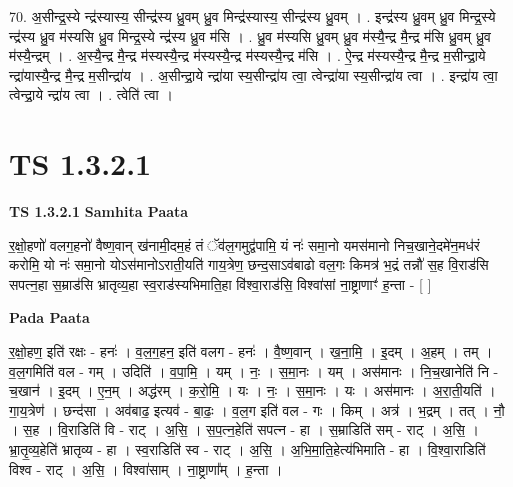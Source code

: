 \documentclass[17pt]{extarticle}
\begin{document}
70. अ॒सीन्द्र॒स्ये न्द्र॑स्यास्य॒ सीन्द्र॑स्य ध्रु॒वम् ध्रु॒व मिन्द्र॑स्यास्य॒ सीन्द्र॑स्य ध्रु॒वम् । . इन्द्र॑स्य ध्रु॒वम् ध्रु॒व मिन्द्र॒स्ये न्द्र॑स्य ध्रु॒व म॑स्यसि ध्रु॒व मिन्द्र॒स्ये न्द्र॑स्य ध्रु॒व म॑सि । . ध्रु॒व म॑स्यसि ध्रु॒वम् ध्रु॒व म॑स्यै॒न्द्र मै॒न्द्र म॑सि ध्रु॒वम् ध्रु॒व म॑स्यै॒न्द्रम् । . अ॒स्यै॒न्द्र मै॒न्द्र म॑स्यस्यै॒न्द्र म॑स्यस्यै॒न्द्र म॑स्यस्यै॒न्द्र म॑सि । . ऐ॒न्द्र म॑स्यस्यै॒न्द्र मै॒न्द्र म॒सीन्द्रा॒ये न्द्रा॑यास्यै॒न्द्र मै॒न्द्र म॒सीन्द्रा॑य । . अ॒सीन्द्रा॒ये न्द्रा॑या स्य॒सीन्द्रा॑य त्वा॒ त्वेन्द्रा॑या स्य॒सीन्द्रा॑य त्वा । . इन्द्रा॑य त्वा॒ त्वेन्द्रा॒ये न्द्रा॑य त्वा । . त्वेति॑ त्वा । \newline
\pagebreak
{}
\section*{ TS 1.3.2.1 }

\textbf{TS 1.3.2.1 } \newline
\textbf{Samhita Paata} \newline

र॒क्षो॒हणो॑ वलग॒हनो॑ वैष्ण॒वान् ख॑नामी॒दम॒हं तं ॅव॑ल॒गमुद्व॑पामि॒ यं नः॑ समा॒नो यमस॑मानो निच॒खाने॒दमे॑न॒मध॑रं करोमि॒ यो नः॑ समा॒नो योऽस॑मानोऽराती॒यति॑ गाय॒त्रेण॒ छन्द॒साऽव॑बाढो वल॒गः किमत्र॑ भ॒द्रं तन्नौ॑ स॒ह वि॒राड॑सि सपत्न॒हा स॒म्राड॑सि भ्रातृव्य॒हा स्व॒राड॑स्यभिमाति॒हा वि॑श्वा॒राड॑सि॒ विश्वा॑सां ना॒ष्ट्राणाꣳ॑ ह॒न्ता - [ ] \newline

\textbf{Pada Paata} \newline

र॒क्षो॒हण॒ इति॑ रक्षः - हनः॑ । व॒ल॒ग॒हन॒ इति॑ वलग - हनः॑ । वै॒ष्ण॒वान् । ख॒ना॒मि॒ । इ॒दम् । अ॒हम् । तम् । व॒ल॒गमिति॑ वल - गम् । उदिति॑ । व॒पा॒मि॒ । यम् । नः॒ । स॒मा॒नः । यम् । अस॑मानः । नि॒च॒खानेति॑ नि - च॒खान॑ । इ॒दम् । ए॒न॒म् । अद्ध॑रम् । क॒रो॒मि॒ । यः । नः॒ । स॒मा॒नः । यः । अस॑मानः । अ॒रा॒ती॒यति॑ । गा॒य॒त्रेण॑ । छन्द॑सा । अव॑बाढ॒ इत्यव॑ - बा॒ढः॒ । व॒ल॒ग इति॑ वल - गः । किम् । अत्र॑ । भ॒द्रम् । तत् । नौ॒ । स॒ह । वि॒राडिति॑ वि - राट् । अ॒सि॒ । स॒प॒त्न॒हेति॑ सपत्न - हा । स॒म्राडिति॑ सम् - राट् । अ॒सि॒ । भ्रा॒तृ॒व्य॒हेति॑ भ्रातृव्य - हा । स्व॒राडिति॑ स्व - राट् । अ॒सि॒ । अ॒भि॒मा॒ति॒हेत्य॑भिमाति - हा । वि॒श्वा॒राडिति॑ विश्व - राट् । अ॒सि॒ । विश्वा॑साम् । ना॒ष्ट्राणा᳚म् । ह॒न्ता ।  \newline
\end{document}
